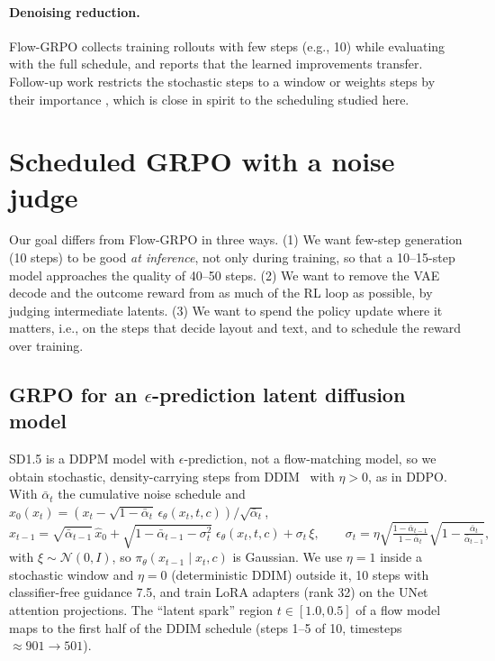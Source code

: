 \documentclass{article}
\newcommand{\xhat}{\hat{x}_0}
\begin{document}
\paragraph{Denoising reduction.}
Flow-GRPO collects training rollouts with few steps (e.g., 10) while evaluating with the full schedule, and reports that the
learned improvements transfer. Follow-up work restricts the stochastic steps to a window
\citep{li2025mixgrpo} or weights steps by their importance \citep{he2025tempflowgrpo}, which is close in spirit to
the scheduling studied here.

\section{Scheduled GRPO with a noise judge}
\label{sec:method}

Our goal differs from Flow-GRPO in three ways. (1) We want few-step generation (10 steps) to be good \emph{at inference},
not only during training, so that a 10--15-step model approaches the quality of 40--50 steps. (2) We want to remove the VAE
decode and the outcome reward from as much of the RL loop as possible, by judging intermediate latents. (3) We want to spend
the policy update where it matters, i.e., on the steps that decide layout and text, and to schedule the reward over training.

\subsection{GRPO for an $\epsilon$-prediction latent diffusion model}
SD1.5 is a DDPM model with $\epsilon$-prediction, not a flow-matching model, so we obtain stochastic, density-carrying steps from
DDIM~\citep{song2021ddim} with $\eta>0$, as in DDPO. With $\bar\alpha_t$ the cumulative noise schedule and
$\xhat(x_t)=(x_t-\sqrt{1-\bar\alpha_t}\,\epsilon_\theta(x_t,t,c))/\sqrt{\bar\alpha_t}$,
\begin{equation}
  x_{t-1} = \sqrt{\bar\alpha_{t-1}}\,\xhat + \sqrt{1-\bar\alpha_{t-1}-\sigma_t^2}\;\epsilon_\theta(x_t,t,c) + \sigma_t\,\xi,
  \qquad
  \sigma_t = \eta\sqrt{\tfrac{1-\bar\alpha_{t-1}}{1-\bar\alpha_t}}\sqrt{1-\tfrac{\bar\alpha_t}{\bar\alpha_{t-1}}},
  \label{eq:ddim}
\end{equation}
with $\xi\sim\mathcal N(0,I)$, so $\pi_\theta(x_{t-1}\mid x_t,c)$ is Gaussian. We use $\eta=1$ inside a stochastic window and
$\eta=0$ (deterministic DDIM) outside it, 10 steps with classifier-free guidance 7.5, and train LoRA adapters
\citep{hu2022lora} (rank 32) on the UNet attention projections. The ``latent spark'' region $t\in[1.0,0.5]$ of a flow model
maps to the first half of the DDIM schedule (steps 1--5 of 10, timesteps $\approx 901\to 501$).
\end{document}
